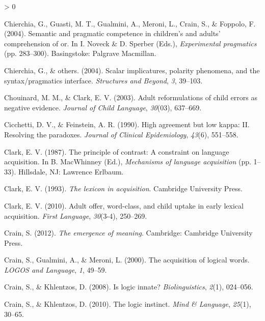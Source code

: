 \documentclass[
  english,
  ,man,floatsintext]{apa6}
\newlength{\cslhangindent}
\newenvironment{CSLReferences}[2] %
 {%
  \setlength{\parindent}{0pt}
  \ifodd #1 \everypar{\setlength{\hangindent}{\cslhangindent}}\ignorespaces\fi
  \ifnum #2 > 0
  \setlength{\parskip}{#2\baselineskip}
  \fi
 }%
 {}
\begin{document}
\begin{CSLReferences}{1}{0}
\leavevmode\hypertarget{ref-chierchia2004semantic}{}%
Chierchia, G., Guasti, M. T., Gualmini, A., Meroni, L., Crain, S., \& Foppolo, F. (2004). Semantic and pragmatic competence in children's and adults' comprehension of or. In I. Noveck \& D. Sperber (Eds.), \emph{Experimental pragmatics} (pp. 283--300). Basingstoke: Palgrave Macmillan.

\leavevmode\hypertarget{ref-chierchia2004scalar}{}%
Chierchia, G., \& others. (2004). Scalar implicatures, polarity phenomena, and the syntax/pragmatics interface. \emph{Structures and Beyond}, \emph{3}, 39--103.

\leavevmode\hypertarget{ref-chouinardclark2003}{}%
Chouinard, M. M., \& Clark, E. V. (2003). Adult reformulations of child errors as negative evidence. \emph{Journal of Child Language}, \emph{30}(03), 637--669.

\leavevmode\hypertarget{ref-cicchetti1990high}{}%
Cicchetti, D. V., \& Feinstein, A. R. (1990). High agreement but low kappa: II. Resolving the paradoxes. \emph{Journal of Clinical Epidemiology}, \emph{43}(6), 551--558.

\leavevmode\hypertarget{ref-clark1987principle}{}%
Clark, E. V. (1987). The principle of contrast: A constraint on language acquisition. In B. MacWhinney (Ed.), \emph{Mechanisms of language acquisition} (pp. 1--33). Hillsdale, NJ: Lawrence Erlbaum.

\leavevmode\hypertarget{ref-clark1993lexicon}{}%
Clark, E. V. (1993). \emph{The lexicon in acquisition}. Cambridge University Press.

\leavevmode\hypertarget{ref-clark2010adult}{}%
Clark, E. V. (2010). Adult offer, word-class, and child uptake in early lexical acquisition. \emph{First Language}, \emph{30}(3-4), 250--269.

\leavevmode\hypertarget{ref-crain2012emergence}{}%
Crain, S. (2012). \emph{The emergence of meaning}. Cambridge: Cambridge University Press.

\leavevmode\hypertarget{ref-crain2000acquisition}{}%
Crain, S., Gualmini, A., \& Meroni, L. (2000). The acquisition of logical words. \emph{LOGOS and Language}, \emph{1}, 49--59.

\leavevmode\hypertarget{ref-crain2008logic}{}%
Crain, S., \& Khlentzos, D. (2008). Is logic innate? \emph{Biolinguistics}, \emph{2}(1), 024--056.

\leavevmode\hypertarget{ref-crain2010logic}{}%
Crain, S., \& Khlentzos, D. (2010). The logic instinct. \emph{Mind \& Language}, \emph{25}(1), 30--65.


\end{CSLReferences}
\end{document}
